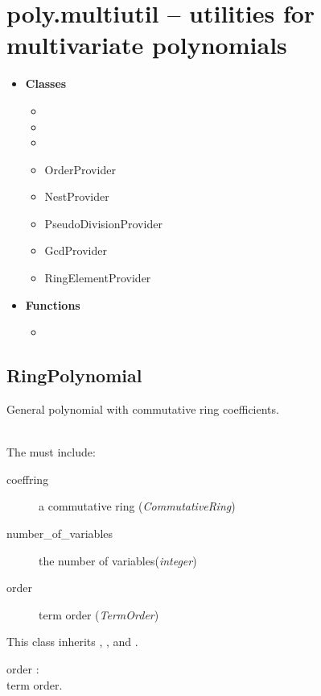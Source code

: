 

 \section{poly.multiutil -- utilities for multivariate polynomials}
 \begin{itemize}
   \item {\bf Classes}
     \begin{itemize}
     \item {}
     \item {}
     \item {}
     \item OrderProvider
     \item NestProvider
     \item PseudoDivisionProvider
     \item GcdProvider
     \item RingElementProvider
     \end{itemize}
   \item {\bf Functions}
     \begin{itemize}
     \item {}
     \end{itemize}
 \end{itemize}

\C

 \subsection{RingPolynomial}
 General polynomial with commutative ring coefficients.

 \initialize
   \\
  \spacing
  \quad The  must include:
  \begin{description}
  \item[coeffring] a commutative ring ({\it CommutativeRing})
  \item[number\_of\_variables] the number of variables({\it integer})
  \item[order] term order ({\it TermOrder})
  \end{description}
  \quad This class inherits ,
  ,
   and
  .
%
  \begin{at}
    \item[order]:\\
      term order.
  \end{at}
%
  \method

